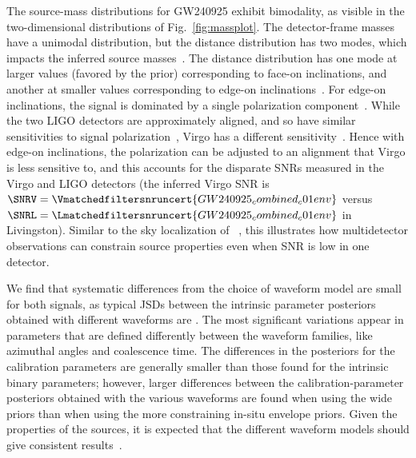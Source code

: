 The source-mass distributions for \ac{GW240925} exhibit bimodality, as visible in the two-dimensional distributions of Fig.~\ref{fig:massplot}.
The detector-frame masses have a unimodal distribution, but the distance distribution has two modes, which impacts the inferred source masses~\cite{Krolak:1987ofj,LIGOScientific:2025hdt}.
The distance distribution has one mode at larger values (favored by the prior) corresponding to face-on inclinations, and another at smaller values corresponding to edge-on inclinations~\cite{Nissanke:2009kt,Narikawa:2017wsz,Usman:2018imj}.
For edge-on inclinations, the signal is dominated by a single polarization component~\cite{Cutler:1994ys,Sathyaprakash:2009xs,Abbott:2016wiq}.
While the two \ac{LIGO} detectors are approximately aligned, and so have similar sensitivities to signal polarization~\cite{Thorne:1987,Finn:1992xs,LIGOScientific:2025hdt}, Virgo has a different sensitivity~\cite{Schutz:2011tw,LIGOScientific:2017ycc}.
Hence with edge-on inclinations, the polarization can be adjusted to an alignment that Virgo is less sensitive to, and this accounts for the disparate \acp{SNR} measured in the Virgo and \ac{LIGO} detectors (the inferred Virgo \ac{SNR} is $\SNRV = \Vmatchedfiltersnruncert{GW240925_combined_c01env}$ versus $\SNRL = \Lmatchedfiltersnruncert{GW240925_combined_c01env}$ in Livingston).
Similar to the sky localization of \gwBNS~\cite{TheLIGOScientific:2017qsa}, this illustrates how multidetector observations can constrain source properties even when \ac{SNR} is low in one detector.

We find that systematic differences from the choice of waveform model are small for both signals, as typical \acp{JSD} between the intrinsic parameter posteriors obtained with different waveforms are \PEWFSysJSD.
The most significant variations appear in parameters that are defined differently between the waveform families, like azimuthal angles and coalescence time.
The differences in the posteriors for the calibration parameters are generally smaller than those found for the intrinsic binary parameters; however, larger differences between the calibration-parameter posteriors obtained with the various waveforms are found when using the wide priors than when using the more constraining in-situ envelope priors.
Given the properties of the sources, it is expected that the different waveform models should give consistent results~\cite{LIGOScientific:2025slb}.


